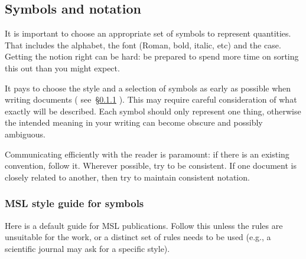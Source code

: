 \subsection{Symbols and notation}
It is important to choose an appropriate set of symbols to represent quantities. That includes the alphabet, the font (Roman, bold, italic, etc) and the case. Getting the notion right can be hard: be prepared to spend more time on sorting this out than you might expect.

It pays to choose the style and a selection of symbols as early as possible when writing documents ( see~\S\ref{sss:style_guide} ). This may require careful consideration of what exactly will be described. Each symbol should only represent one thing, otherwise the intended meaning in your writing can become obscure and possibly ambiguous. 

Communicating efficiently with the reader is paramount: if there is an existing convention, follow it. Wherever possible, try to be consistent. If one document is closely related to another, then try to maintain consistent notation. 

\subsubsection{MSL style guide for symbols}
\label{sss:style_guide}
Here is a default guide for MSL publications. Follow this unless the rules are unsuitable for the work, or a distinct set of rules needs to be used (e.g., a scientific journal may ask for a specific style).

